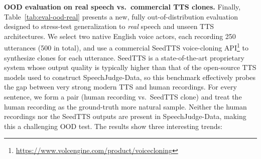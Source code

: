 \documentclass[]{bytedance_seed}
\begin{document}
\textbf{OOD evaluation on real speech vs.\ commercial TTS clones.}\quad
Finally, Table~\ref{tab:eval-ood-real} presents a new, fully
out-of-distribution evaluation designed to stress-test generalization to
\textit{real} speech and unseen TTS architectures.
We select two native English voice actors, each recording 250 utterances
(500 in total), and use a commercial SeedTTS voice-cloning API\footnote{\href{https://www.volcengine.com/product/voicecloning}{https://www.volcengine.com/product/voicecloning}} to synthesize
clones for each utterance.
SeedTTS is a state-of-the-art proprietary system whose output quality is
typically higher than that of the open-source TTS models used to construct
{SpeechJudge-Data}, so this benchmark effectively probes the gap
between very strong modern TTS and human recordings.
For every sentence, we form a pair (human recording vs.\ SeedTTS clone) and
treat the human recording as the ground-truth more natural sample.
Neither the human recordings nor the SeedTTS outputs are present in
{SpeechJudge-Data}, making this a challenging OOD test.
The results show three interesting trends:
\end{document}
